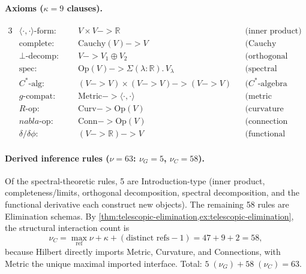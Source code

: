 \documentclass[11pt,a4paper]{article}
\def\to{->}%
\def\nabla{nabla}%
\theoremstyle{plain}
\theoremstyle{definition}
\theoremstyle{remark}
\newcommand{\R}{\mathbb{R}}
\begin{document}
\paragraph{Axioms ($\kappa = 9$ clauses).}
\begin{alignat*}{3}
    &\langle\cdot,\cdot\rangle\text{-form:} &\quad& V \times V \to \R
        && \text{(inner product)} \\
    &\mathrm{complete}\text{:}               && \mathrm{Cauchy}(V) \to V
        && \text{(Cauchy completeness)} \\
    &\perp\text{-decomp:}                    && V \to V_1 \oplus V_2
        && \text{(orthogonal decomposition)} \\
    &\mathrm{spec}\text{:}                   && \mathrm{Op}(V) \to \Sigma(\lambda : \R).\, V_\lambda
        && \text{(spectral decomposition)} \\
    &C^*\text{-alg:}                         && (V \to V) \times (V \to V) \to (V \to V)
        && \text{($C^*$-algebra structure)} \\
    &g\text{-compat:}                        && \mathrm{Metric} \to \langle\cdot,\cdot\rangle
        && \text{(metric compatibility)} \\
    &R\text{-op:}                            && \mathrm{Curv} \to \mathrm{Op}(V)
        && \text{(curvature operator)} \\
    &\nabla\text{-op:}                       && \mathrm{Conn} \to \mathrm{Op}(V)
        && \text{(connection operator)} \\
    &\delta/\delta\phi\text{:}               && (V \to \R) \to V
        && \text{(functional derivative)}
\end{alignat*}

\paragraph{Derived inference rules ($\nu = 63$: $\nu_G = 5$, $\nu_C = 58$).}
Of the spectral-theoretic rules, 5 are Introduction-type (inner product, completeness/limits, orthogonal decomposition, spectral decomposition, and the functional derivative each construct new objects).
The remaining 58 rules are Elimination schemas.
By \cref{thm:telescopic-elimination,ex:telescopic-elimination}, the structural interaction count is
\[
  \nu_C
  =
  \max_{\mathrm{ref}} \nu + \kappa + (\text{distinct refs} - 1)
  =
  47 + 9 + 2
  =
  58,
\]
because Hilbert directly imports Metric, Curvature, and Connections, with Metric the unique maximal imported interface.
Total: $5\;(\nu_G) + 58\;(\nu_C) = 63$.
\end{document}
